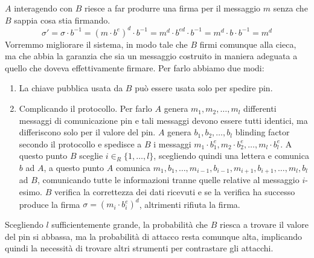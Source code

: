 $A$ interagendo con $B$ riesce a far produrre una firma per il messaggio $m$ senza che $B$ sappia
cosa stia firmando.
\[
  \sigma' = \sigma \cdot b^{-1} = (m \cdot  b^e)^d \cdot b^{-1} = m^d \cdot b^{ed} \cdot b^{-1} = 
  m^d \cdot b \cdot b^{-1} = m^d
\]
Vorremmo migliorare il sistema, in modo tale che $B$ firmi comunque alla cieca, ma che abbia la garanzia 
che sia un messaggio costruito in maniera adeguata a quello che doveva effettivamente firmare. Per farlo 
abbiamo due modi:
\begin{enumerate}
  \item La chiave pubblica usata da $B$ può essere usata solo per spedire pin.
  \item Complicando il protocollo. Per farlo $A$ genera $m_1, m_2, \dots, m_l$
  differenti messaggi di comunicazione pin e tali messaggi devono essere tutti 
  identici, ma differiscono solo per il valore del pin. $A$ genera $b_1, b_2, \dots, b_l$
  blinding factor secondo il protocollo e spedisce a $B$ i messaggi $m_1 \cdot b_1^e,
  m_2 \cdot b_2^e, \dots, m_l \cdot b_l^e$. A questo punto $B$ sceglie $i \in_R \{1, \dots, l\}$,
  scegliendo quindi una lettera e comunica $b$ ad $A$, a questo punto $A$ comunica 
  $m_1, b_1, \dots, m_{i-1},b_{i-1},m_{i+1},b_{i+1}, \dots, m_l, b_l$ ad $B$,
  comunicando tutte le informazioni tranne quelle relative al messaggio $i$-esimo.
  $B$ verifica la correttezza dei dati ricevuti e se la verifica ha successo produce 
  la firma $\sigma = (m_i \cdot b_i^e)^d$, altrimenti rifiuta la firma.
\end{enumerate}
Scegliendo $l$ sufficientemente grande, la probabilità che $B$ riesca a trovare il valore
del pin si abbassa, ma la probabilità di attacco resta comunque alta, implicando quindi 
la necessità di trovare altri strumenti per contrastare gli attacchi.